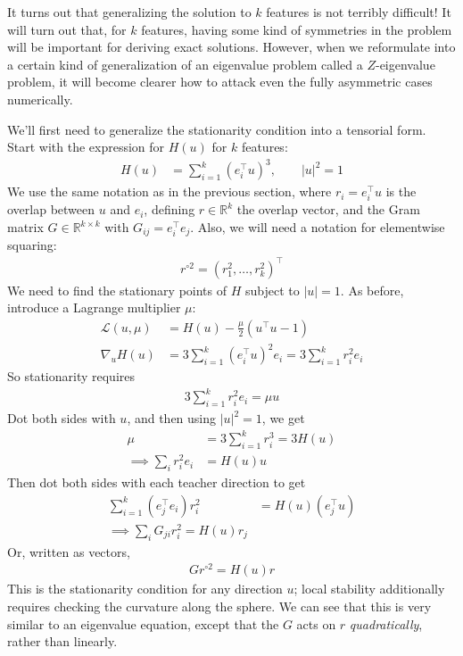 \documentclass[11pt, reqno]{amsart}
\theoremstyle{notestyle}
\theoremstyle{defstyle}
\begin{document}
It turns out that generalizing the solution to $k$ features is not terribly difficult!
It will turn out that, for $k$ features, having some kind of symmetries in the problem will be important for deriving exact solutions.
However, when we reformulate into a certain kind of generalization of an eigenvalue problem called a $Z$-eigenvalue problem, it will become clearer how to attack even the fully asymmetric cases numerically.

We'll first need to generalize the stationarity condition into a tensorial form.
Start with the expression for $H(u)$ for $k$ features:
\begin{align*}
    H(u)
    &= \sum_{i=1}^k (e_i^\top u)^3,
    \qquad |u|^2 = 1
\end{align*}
We use the same notation as in the previous section, where $r_i = e_i^\top u$ is the overlap between $u$ and $e_i$, defining $r \in \mathbb{R}^k$ the overlap vector, and the Gram matrix $G \in \mathbb{R}^{k\times k}$ with $G_{ij} = e_i^\top e_j$.
Also, we will need a notation for elementwise squaring:
\begin{align*}
    r^{\circ 2} = (r_1^2, \dots,r_k^2)^\top
\end{align*}
We need to find the stationary points of $H$ subject to $|u| = 1$.
As before, introduce a Lagrange multiplier $\mu$:
\begin{align*}
    \mathcal{L}(u, \mu)
    &= H(u) - \frac{\mu}{2} (u^\top u - 1) \\
    \nabla_u H(u)
    &= 3 \sum_{i=1}^k (e_i^\top u)^2 e_i
    = 3 \sum_{i=1}^k r_i^2 e_i
\end{align*}
So stationarity requires
\begin{align*}
    3 \sum_{i=1}^k r_i^2 e_i
    = \mu u
\end{align*}
Dot both sides with $u$, and then using $|u|^2 = 1$, we get
\begin{align*}
    \mu
    &= 
    3 \sum_{i=1}^k r_i^3
    = 3 H(u) \\
    \implies
    \sum_i r_i^2 e_i
    &= H(u) u
\end{align*}
Then dot both sides with each teacher direction to get
\begin{align*}
    \sum_{i=1}^k (e_j^\top e_i) r_i^2
    &= H(u) (e_j^\top u) \\
    \implies
    \sum_{i}
    G_{ji} r_i^2 = H(u) r_j
\end{align*}
Or, written as vectors,
\begin{align*}
    \boxed{G r^{\circ 2} = H(u) r}
\end{align*}
This is the stationarity condition for any direction $u$; local stability additionally requires checking the curvature along the sphere.
We can see that this is very similar to an eigenvalue equation, except that the $G$ acts on $r$ \emph{quadratically}, rather than linearly.
\end{document}
